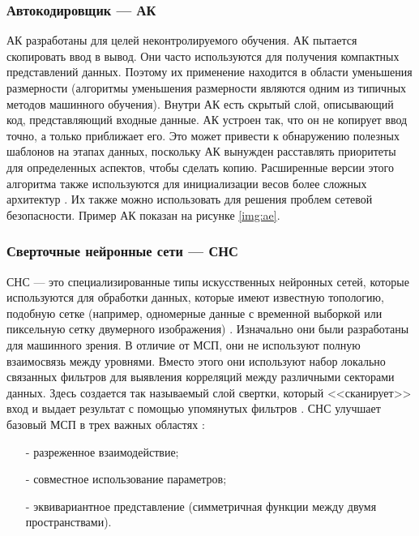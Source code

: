 
\FloatBarrier

\subsubsection{Автокодировщик --- АК}

АК разработаны для целей неконтролируемого обучения. АК пытается скопировать ввод в вывод. Они часто используются для получения компактных представлений данных. Поэтому их применение находится в области уменьшения размерности (алгоритмы уменьшения размерности являются одним из типичных методов машинного обучения). Внутри АК есть скрытый слой, описывающий код, представляющий входные данные. АК устроен так, что он не копирует ввод точно, а только приближает его. Это может привести к обнаружению полезных шаблонов на этапах данных, поскольку АК вынужден расставлять приоритеты для определенных аспектов, чтобы сделать копию. Расширенные версии этого алгоритма также используются для инициализации весов более сложных архитектур \cite{introdmachlearn}. Их также можно использовать для решения проблем сетевой безопасности. Пример АК показан на рисунке \ref{img:ae}.


\FloatBarrier

\subsubsection{Сверточные нейронные сети --- СНС}

СНС --- это специализированные типы искусственных нейронных сетей, которые используются для обработки данных, которые имеют известную топологию, подобную сетке (например, одномерные данные с временной выборкой или пиксельную сетку двумерного изображения) \cite{introdmachlearn}. Изначально они были разработаны для машинного зрения. В отличие от МСП, они не используют полную взаимосвязь между уровнями. Вместо этого они используют набор локально связанных фильтров для выявления корреляций между различными секторами данных. Здесь создается так называемый слой свертки, который <<сканирует>> вход и выдает результат с помощью упомянутых фильтров \cite{deeplearninmob}. СНС улучшает базовый МСП в трех важных областях \cite{introdmachlearn}:
\begin{itemize}
	\item[-] разреженное взаимодействие;
	\item[-] совместное использование параметров;
	\item[-] эквивариантное представление (симметричная функции между двумя пространствами).
\end{itemize}

